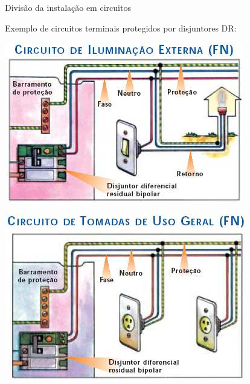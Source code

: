 \begin{frame}{Divisão da instalação em circuitos}
	\begin{block}{}
		Exemplo de circuitos terminais protegidos por disjuntores DR:
	\end{block}

	\bigskip

	\begin{minipage}{0.49\linewidth}
		\centering
		\includegraphics[width=1\linewidth]{Figuras/Ch05/fig9}
	\end{minipage}\hfill
	\begin{minipage}{0.49\linewidth}
		\centering
		\includegraphics[width=1\linewidth]{Figuras/Ch05/fig10}
	\end{minipage}
\end{frame}


